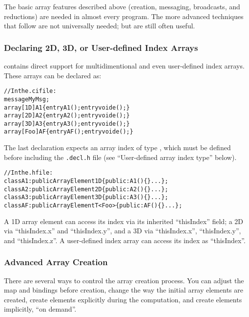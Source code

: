 The basic array features described above (creation, messaging,
broadcasts, and reductions) are needed in almost every
\charmpp{} program.  The more advanced techniques that follow
are not universally needed; but are still often useful.


\subsubsection{Declaring 2D, 3D, or User-defined Index Arrays}

\charmpp{} contains direct support for multidimentional and
even user-defined index arrays.  These arrays can be declared as:

\begin{alltt}
//In the .ci file:
message MyMsg;
array [1D] A1 \{ entry A1(); entry void e();\}
array [2D] A2 \{ entry A2(); entry void e();\}
array [3D] A3 \{ entry A3(); entry void e();\}
array [Foo] AF \{ entry AF(); entry void e();\}
\end{alltt}

The last declaration expects an array index of type ,
which must be defined before including the \texttt{.decl.h} file 
(see ``User-defined array index type'' below).  

\begin{alltt}
//In the .h file:
class A1:public ArrayElement1D \{ public: A1()\{\} ...\};
class A2:public ArrayElement2D \{ public: A2()\{\} ...\};
class A3:public ArrayElement3D \{ public: A3()\{\} ...\};
class AF:public ArrayElementT<Foo> \{ public: AF()\{\} ...\};
\end{alltt}

A 1D array element can access its index via its inherited ``thisIndex''
field; a 2D via ``thisIndex.x'' and ``thisIndex.y'', and a 3D via
``thisIndex.x'', ``thisIndex.y'', and ``thisIndex.z''.  A user-defined
index array can access its index as ``thisIndex''.


\subsubsection{Advanced Array Creation}
\label{advanced array create}
There are several ways to control the array creation process.
You can adjust the map and bindings before creation, change
the way the initial array elements are created, create elements
explicitly during the computation, and create elements implicitly,
``on demand''.  

